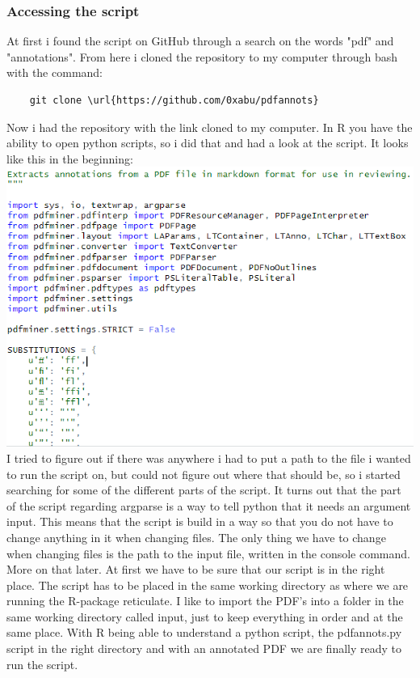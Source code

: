 \documentclass{article}
\begin{document}
\subsubsection{Accessing the script}
At first i found the script on GitHub through a search on the words "pdf" and "annotations". From here i cloned the repository to my computer through bash with the command:
\begin{verbatim}
    git clone \url{https://github.com/0xabu/pdfannots}
\end{verbatim}
Now i had the repository with the link cloned to my computer. In R you have the ability to open python scripts, so i did that and had a look at the script. It looks like this in the beginning: \newline
\includegraphics[scale=0.85]{part_of_pdfannotspy.PNG} \newline
I tried to figure out if there was anywhere i had to put a path to the file i wanted to run the script on, but could not figure out where that should be, so i started searching for some of the different parts of the script. It turns out that the part of the script regarding argparse is a way to tell python that it needs an argument input. This means that the script is build in a way so that you do not have to change anything in it when changing files. The only thing we have to change when changing files is the path to the input file, written in the console command. More on that later. At first we have to be sure that our script is in the right place. The script has to be placed in the same working directory as where we are running the R-package reticulate. I like to import the PDF's into a folder in the same working directory called input, just to keep everything in order and at the same place. \newline
With R being able to understand a python script, the pdfannots.py script in the right directory and with an annotated PDF we are finally ready to run the script.
\end{document}
